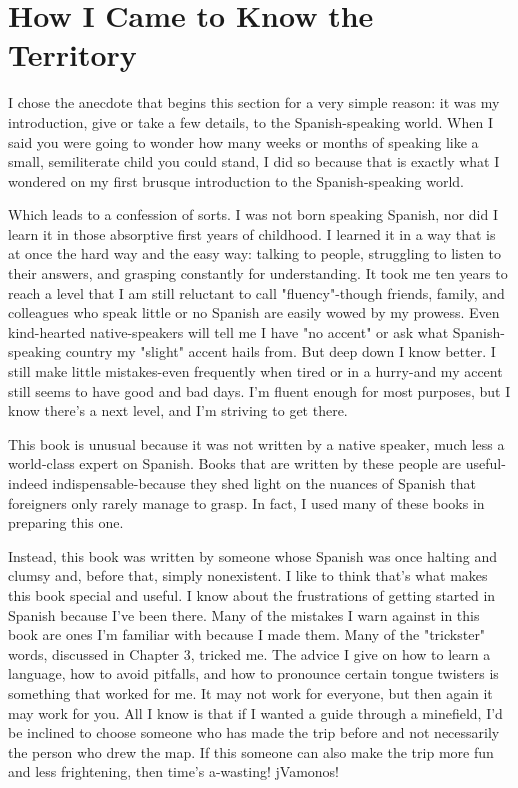 \section{How I Came to Know the Territory}

I chose the anecdote that begins this section for a very simple
reason: it was my introduction, give or take a few details, to the
Spanish-speaking world. When I said you were going to wonder how
many weeks or months of speaking like a small, semiliterate child
you could stand, I did so because that is exactly what I wondered on
my first brusque introduction to the Spanish-speaking world.

Which leads to a confession of sorts. I was not born speaking
Spanish, nor did I learn it in those absorptive first years of childhood. I
learned it in a way that is at once the hard way and the easy way: talking to people, struggling to listen to their answers, and grasping constantly for understanding. It took me ten years to reach a level that I
am still reluctant to call "fluency"-though friends, family, and colleagues who speak little or no Spanish are easily wowed by my prowess. Even kind-hearted native-speakers will tell me I have "no accent"
or ask what Spanish-speaking country my "slight" accent hails from.
But deep down I know better. I still make little mistakes-even frequently when tired or in a hurry-and my accent still seems to have
good and bad days. I'm fluent enough for most purposes, but I know
there's a next level, and I'm striving to get there.

This book is unusual because it was not written by a native
speaker, much less a world-class expert on Spanish. Books that are
written by these people are useful-indeed indispensable-because
they shed light on the nuances of Spanish that foreigners only rarely
manage to grasp. In fact, I used many of these books in preparing
this one.

Instead, this book was written by someone whose Spanish was
once halting and clumsy and, before that, simply nonexistent. I like to
think that's what makes this book special and useful. I know about the
frustrations of getting started in Spanish because I've been there. Many
of the mistakes I warn against in this book are ones I'm familiar with
because I made them. Many of the "trickster" words, discussed in
Chapter 3, tricked me. The advice I give on how to learn a language,
how to avoid pitfalls, and how to pronounce certain tongue twisters
is something that worked for me. It may not work for everyone, but
then again it may work for you. All I know is that if I wanted a guide
through a minefield, I'd be inclined to choose someone who has made
the trip before and not necessarily the person who drew the map. If
this someone can also make the trip more fun and less frightening,
then time's a-wasting! jVamonos!
